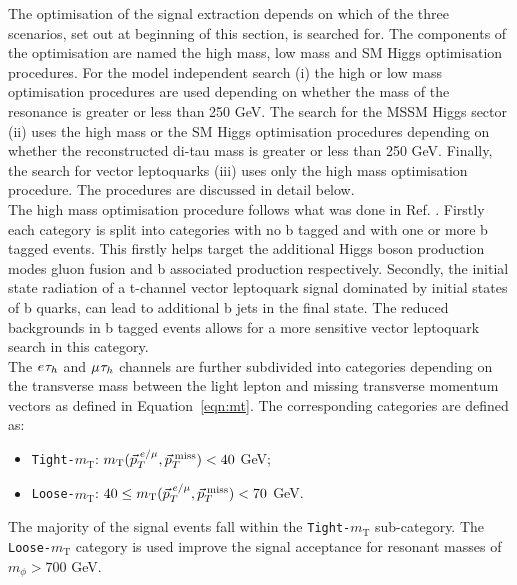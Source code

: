The optimisation of the signal extraction depends on which of the three scenarios, set out at beginning of this section, is searched for.
The components of the optimisation are named the high mass, low mass and SM Higgs optimisation procedures.
For the model independent search (i) the high or low mass optimisation procedures are used depending on whether the mass of the resonance is greater or less than 250 GeV.
The search for the MSSM Higgs sector (ii) uses the high mass or the SM Higgs optimisation procedures depending on whether the reconstructed di-tau mass \cite{} is greater or less than 250 GeV.
Finally, the search for vector leptoquarks (iii) uses only the high mass optimisation procedure.
The procedures are discussed in detail below. \\

The high mass optimisation procedure follows what was done in Ref. \cite{}.
Firstly each category is split into categories with no b tagged and with one or more b tagged events.
This firstly helps target the additional Higgs boson production modes gluon fusion and b associated production respectively.
Secondly, the initial state radiation of a t-channel vector leptoquark signal dominated by initial states of b quarks, can lead to additional b jets in the final state.
The reduced backgrounds in b tagged events allows for a more sensitive vector leptoquark search in this category. \\

The $e_{}\tau_{h}$ and $\mu_{}\tau_{h}$ channels are further subdivided into categories depending on the transverse mass between the light lepton and missing transverse momentum vectors as defined in Equation~\ref{eqn:mt}.
The corresponding categories are defined as:
\begin{itemize}
\item \texttt{Tight-$m_{\text{T}}$}: $m_{\text{T}}(\vec{p}_{T}^{\hspace{2pt}e/\mu},\vec{p}_{T}^{\hspace{2pt}\text{miss}}) < 40$ GeV;
\item \texttt{Loose-$m_{\text{T}}$}: $40 \leq m_{\text{T}}(\vec{p}_{T}^{\hspace{2pt}e/\mu},\vec{p}_{T}^{\hspace{2pt}\text{miss}}) < 70$ GeV.
\end{itemize}
The majority of the signal events fall within the \texttt{Tight-$m_{\text{T}}$} sub-category.
The \texttt{Loose-$m_{\text{T}}$} category is used improve the signal acceptance for resonant masses of $m_{\phi} > 700$ GeV.\\


